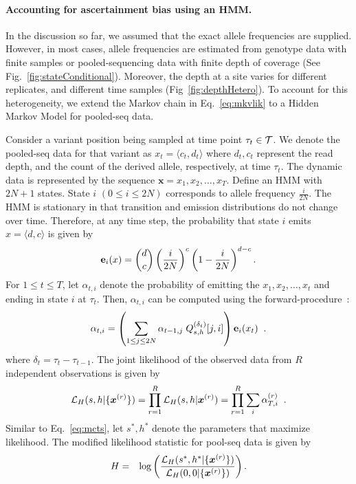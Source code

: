 \documentclass[11pt]{article}
\begin{document}
\paragraph{Accounting for ascertainment bias using an HMM.}
In the discussion so far, we assumed that the exact allele frequencies
are supplied. However, in most cases, allele frequencies are estimated
from genotype data with finite samples or pooled-sequencing data with
finite depth of coverage (See Fig.~\ref{fig:stateConditional}).
Moreover, the depth at a site varies for different replicates, and
different time samples (Fig~\ref{fig:depthHetero}). To account for
this heterogeneity, we extend the Markov chain in Eq.~\ref{eq:mkvlik}
to a Hidden Markov Model for pooled-seq data.

Consider a variant position being sampled at time point $\tau_t\in
{\cal T}$. We denote the pooled-seq data for that variant as $x_t =
\langle c_t,d_t \rangle$ where $d_t, c_t$ represent the read depth,
and the count of the derived allele, respectively, at time
$\tau_t$. The dynamic data is represented by the sequence
$\mathbf{x}=x_1,x_2,\ldots,x_T$. Define an HMM with $2N+1$
states. State $i$ $(0\le i\le 2N)$ corresponds to allele frequency
$\frac{i}{2N}$. The HMM is stationary in that transition and emission
distributions do not change over time. Therefore, at any time step,
the probability that state $i$ emits $x=\langle d, c\rangle $ is given by
\begin{equation*}
{\bf e}_{i}(x) = {d \choose c} \left(\frac{i}{2N} \right)^c\left (1- \frac{i}{2N} \right)^{d-c}.
\end{equation*}
For $1\le t\le T$, let $\alpha_{t,i}$ denote the probability of
emitting the $x_1,x_2,\ldots,x_t$ and ending in state $i$ at
$\tau_t$. Then, $\alpha_{t,i}$ can be computed using the
forward-procedure~\cite{durbin1998biological}:
\begin{equation}
  \alpha_{t,i} = \left( \sum_{1\le j\le 2N} \alpha_{t-1,j}\;Q^{(\delta_t)}_{s,h}[j,i] \right) {\bf e}_{i}(x_t)\;\; .
  \label{eq:hmm}
\end{equation}
where $\delta_t=\tau_t-\tau_{t-1}$. The joint likelihood of the
observed data from $R$ independent observations is given by
\begin{equation}
  {\cal L}_{H}(s,h|\{\bm{x}^{(r)}\})=\prod_{r=1}^R{\cal L}_{H}(s,h|\bm{x}^{(r)}) = 
  \prod_{r=1}^R \sum_i\alpha_{T,i}^{(r)}\;\;.
  \label{eq:hmmlik}
\end{equation}
Similar to Eq.~\ref{eq:mcts}, let $s^*,h^*$ denote the parameters that
maximize likelihood. The modified likelihood statistic for pool-seq
data is given by
\begin{eqnarray}
H &=& \log 
\left(\frac{{\cal L}_H(s^*,h^*|\{\bm{x}^{(r)}\})}{{\cal L}_H(0,0|\{\bm{x}^{(r)}\})}\right).
\label{eq:hmmml}
\end{eqnarray}
\end{document}
